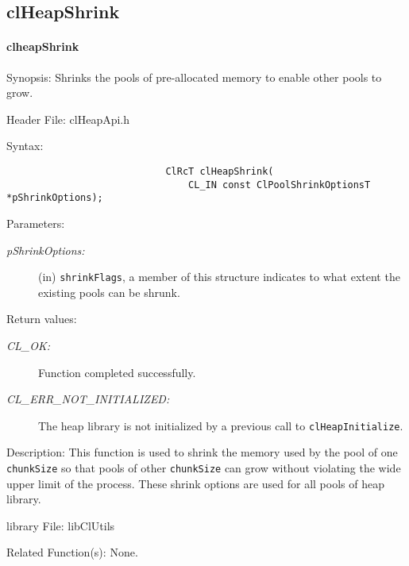 \begin{flushleft}
\subsection{clHeapShrink}
\hypertarget{pageheap107}{}\paragraph{cl\-heap\-Shrink}\label{pageheap107}
\begin{Desc}
\item[Synopsis:]Shrinks the pools of pre-allocated memory to enable other pools to grow.\end{Desc}
\begin{Desc}
\item[Header File:]clHeapApi.h\end{Desc}
\begin{Desc}
\item[Syntax:]
\footnotesize\begin{verbatim}
                			ClRcT clHeapShrink(
                			    CL_IN const ClPoolShrinkOptionsT *pShrinkOptions);
\end{verbatim}
\normalsize
\end{Desc}
\begin{Desc}
\item[Parameters:]
\begin{description}
\item[{\em pShrinkOptions:}](in) {\tt{shrinkFlags}}, a member of this structure indicates to what extent the existing pools can be shrunk.
\end{description}
\end{Desc}
\begin{Desc}
\item[Return values:]
\begin{description}
\item[{\em CL\_\-OK:}] Function completed successfully.
\item[{\em CL\_\-ERR\_\-NOT\_\-INITIALIZED:}] The heap library is not initialized by a previous call to {\tt{clHeapInitialize}}.
\end{description}
\end{Desc}
\begin{Desc}
\item[Description:]This function is used to shrink the memory used by the pool of one {\tt{chunkSize}} so that pools of other {\tt{chunkSize}}
can grow without violating the wide upper limit of the process. These shrink options are used for all pools of heap library.
\end{Desc}
\begin{Desc}
\item[library File:]lib\-Cl\-Utils\end{Desc}
\begin{Desc}
\item[Related Function(s):]None. \end{Desc}
\newpage





\end{flushleft}
